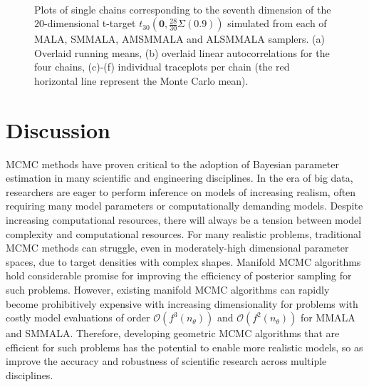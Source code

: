 \documentclass[twoside,11pt]{article}
\begin{document}
\begin{figure}
{	}
	 \\
	\caption{Plots of single chains corresponding to the seventh dimension of the $20$-dimensional t-target
		$t_{30}(\mathbf{0},\frac{28}{30}\Sigma(0.9))$ simulated from each of MALA, SMMALA, AMSMMALA and ALSMMALA samplers. (a) 
		Overlaid running means, (b) overlaid linear autocorrelations for the four chains, (c)-(f) individual traceplots per 
		chain (the red horizontal line represent the Monte Carlo mean).}
	\label{fig:t}
\end{figure}

\newpage
\section{Discussion}

MCMC methods have proven critical to the adoption of Bayesian parameter estimation in many scientific and engineering 
disciplines. In the era of big data, researchers are eager to perform inference on models of increasing realism, often 
requiring many model parameters or computationally demanding models. Despite increasing computational resources, there will 
always be a tension between model complexity and computational resources. For many realistic problems, traditional MCMC 
methods can struggle, even in moderately-high dimensional parameter spaces, due to target densities with complex shapes.  
Manifold MCMC algorithms hold considerable promise for improving the efficiency of posterior sampling for such problems.  
However, existing manifold MCMC algorithms can rapidly become prohibitively expensive with increasing dimensionality for 
problems with costly model evaluations of order $\mathcal{O}(f^3(n_{\theta}))$ and $\mathcal{O}(f^2(n_{\theta}))$ for 
MMALA and SMMALA. Therefore, developing geometric MCMC algorithms that are efficient for such problems has the potential to 
enable more realistic models, so as improve the accuracy and robustness of scientific research across multiple disciplines. 
\end{document}
